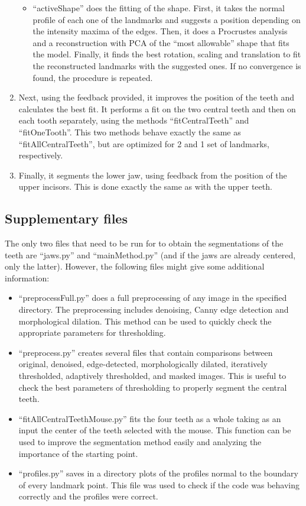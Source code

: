 \documentclass[a4paper,11pt,twoside]{article}
\begin{document}
\begin{enumerate}
\begin{itemize}
\item ``activeShape'' does the fitting of the shape. First, it takes the normal profile of each one of the landmarks and suggests a position depending on the intensity maxima of the edges. Then, it does a Procrustes analysis and a reconstruction with PCA of the ``most allowable'' shape that fits the model. Finally, it finds the best rotation, scaling and translation to fit the reconstructed landmarks with the suggested ones. If no convergence is found, the procedure is repeated.	
\end{itemize}
\item Next, using the feedback provided, it improves the position of the teeth and calculates the best fit. It performs a fit on the two central teeth and then on each tooth separately, using the methods ``fitCentralTeeth'' and ``fitOneTooth''. This two methods behave exactly the same as ``fitAllCentralTeeth'', but are optimized for 2 and 1 set of landmarks, respectively.
\item Finally, it segments the lower jaw, using feedback from the position of the upper incisors. This is done exactly the same as with the upper teeth.
\end{enumerate}

\subsection{Supplementary files}

The only two files that need to be run for to obtain the segmentations of the teeth are ``jaws.py'' and ``mainMethod.py'' (and if the jaws are already centered, only the latter). However, the following files might give some additional information:

\begin{itemize}
\item ``preprocessFull.py'' does a full preprocessing of any image in the specified directory. The preprocessing includes denoising, Canny edge detection and morphological dilation. This method can be used to quickly check the appropriate parameters for thresholding.
\item ``preprocess.py'' creates several files that contain comparisons between original, denoised, edge-detected, morphologically dilated, iteratively thresholded, adaptively thresholded, and masked images. This is useful to check the best parameters of thresholding to properly segment the central teeth.
\item ``fitAllCentralTeethMouse.py'' fits the four teeth as a whole taking as an input the center of the teeth selected with the mouse. This function can be used to improve the segmentation method easily and analyzing the importance of the starting point.
\item ``profiles.py'' saves in a directory plots of the profiles normal to the boundary of every landmark point. This file was used to check if the code was behaving correctly and the profiles were correct.
\end{itemize}
\end{document}
